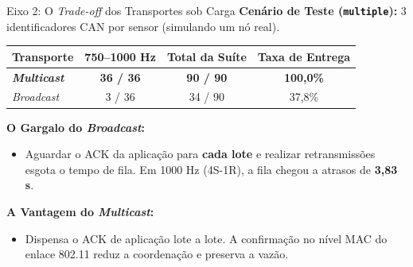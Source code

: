 \begin{frame}{Eixo 2: O \textit{Trade-off} dos Transportes sob Carga}
    \textbf{Cenário de Teste (\texttt{multiple}):} 3 identificadores CAN por sensor (simulando um nó real).
    
    \vspace{0.2cm}
    \begin{table}[]
        \centering
        \small
        \renewcommand{\arraystretch}{1.3}
        \begin{tabular}{l | c | c | c}
            \hline
            \textbf{Transporte} & \textbf{750--1000 Hz} & \textbf{Total da Suíte} & \textbf{Taxa de Entrega} \\
            \hline
            \textit{\textbf{Multicast}} & \textbf{36 / 36} & \textbf{90 / 90} & \textbf{100,0\%} \\
            \hline
            \textit{Broadcast} & 3 / 36 & 34 / 90 & 37,8\% \\
            \hline
        \end{tabular}
    \end{table}

    \vspace{0.4cm}
    \textbf{O Gargalo do \textit{Broadcast}:} 
    \begin{itemize}
        \item Aguardar o ACK da aplicação para \textbf{cada lote} e realizar retransmissões esgota o tempo de fila. Em 1000 Hz (4S-1R), a fila chegou a atrasos de \textbf{3,83 s}.
    \end{itemize}
    \textbf{A Vantagem do \textit{Multicast}:}
    \begin{itemize}
        \item Dispensa o ACK de aplicação lote a lote. A confirmação no nível MAC do enlace 802.11 reduz a coordenação e preserva a vazão.
    \end{itemize}
\end{frame}
